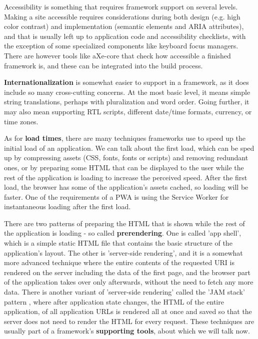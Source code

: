 \documentclass[english,odsaz]{fitthesis}
\begin{document}
Accessibility is something that requires framework support on several
levels. Making a site accessible requires considerations during both design
(e.g. high color contrast) and implementation (semantic elements and ARIA
attributes), and that is usually left up to application code and accessibility
checklists, with the exception of some specialized components like keyboard
focus managers. There are however tools like aXe-core that check how accessible
a finished framework is, and these can be integrated into the build process.

\textbf{Internationalization} is somewhat easier to support in a framework, as it does
include so many cross-cutting concerns. At the most basic level, it means simple
string translations, perhaps with pluralization and word order. Going further,
it may also mean supporting RTL scripts, different date/time formats, currency,
or time zones.

As for \textbf{load times}, there are many techniques frameworks use to speed up the
initial load of an application. We can talk about the first load, which can be
sped up by compressing assets (CSS, fonts, fonts or scripts) and removing
redundant ones, or by preparing some HTML that can be displayed to the user
while the rest of the application is loading to increase the perceived
speed. After the first load, the browser has some of the application's assets
cached, so loading will be faster. One of the requirements of a PWA is using the
Service Worker for instantaneous loading after the first load.

There are two patterns of preparing the HTML that is shown while the rest of the
application is loading - so called \textbf{prerendering}. One is called 'app shell',
which is a simple static HTML file that contains the basic structure of the
application's layout. The other is 'server-side rendering', and it is a somewhat
more advanced technique where the entire contents of the requested URI is
rendered on the server including the data of the first page, and the browser
part of the application takes over only afterwards, without the need to fetch
any more data. There is another variant of 'server-side rendering' called the
'JAM stack' pattern \cite{jamstack}, where after application state changes, the
HTML of the entire application, of all application URLs is rendered all at once
and saved so that the server does not need to render the HTML for every
request. These techniques are usually part of a framework's \textbf{supporting tools},
about which we will talk now.
\end{document}
